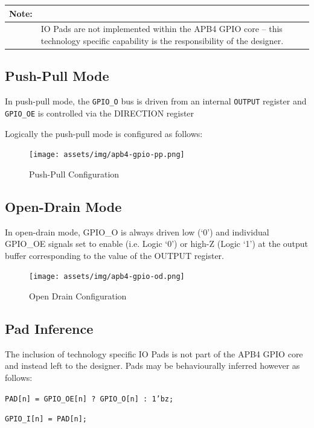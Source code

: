 \begin{longtable}[]{@{}|p{2cm}p{12cm}@{}}
	\textbf{Note:} & \\
	\endhead
	 & IO Pads are not implemented within the APB4 GPIO core --
	this technology specific capability is the responsibility of the
	designer.\\
\end{longtable}

\subsection{Push-Pull Mode}\label{push-pull-mode}

In push-pull mode, the \texttt{GPIO\_O} bus is driven from an internal \texttt{OUTPUT}
register and \texttt{GPIO\_OE} is controlled via the
DIRECTION register

Logically the push-pull mode is configured as follows:

\begin{figure}[tbh]
	\centering
	\texttt{[image: assets/img/apb4-gpio-pp.png]}
	\caption{Push-Pull Configuration}
	\label{fig:apb4-gpio-pp}
\end{figure}


\subsection{Open-Drain Mode}\label{open-drain-mode}

In open-drain mode, GPIO\_O is always driven low (`0') and individual
GPIO\_OE signals set to enable (i.e. Logic `0') or high-Z (Logic `1') at
the output buffer corresponding to the value of the OUTPUT register.

\begin{figure}[tbh]
	\centering
	\texttt{[image: assets/img/apb4-gpio-od.png]}
	\caption{Open Drain Configuration}
	\label{fig:apb4-gpio-od}
\end{figure}

\subsection{Pad Inference}\label{pad-inference}

The inclusion of technology specific IO Pads is not part of the APB4
GPIO core and instead left to the designer. Pads may be behaviourally
inferred however as follows:

\texttt{PAD[n] = GPIO\_OE[n] ? GPIO\_O[n] : 1'bz;}

\texttt{GPIO\_I[n] = PAD[n];}
